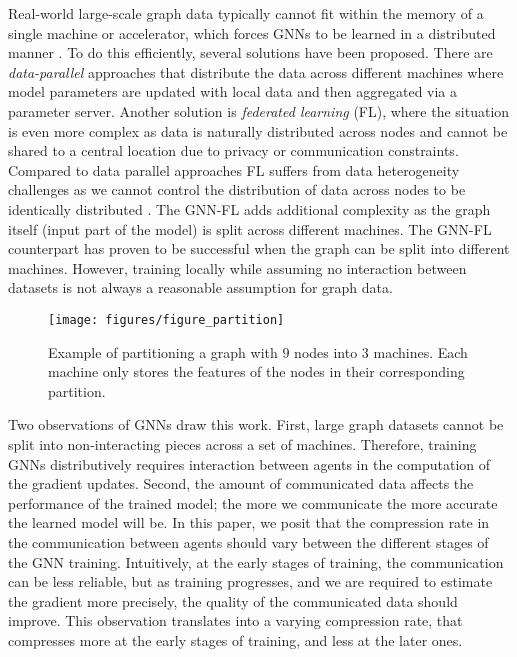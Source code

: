 \documentclass[lettersize,journal]{IEEEtran}
\begin{document}
Real-world large-scale graph data typically cannot fit within the memory of a single machine or accelerator, which forces GNNs to be learned in a distributed manner \cite{cai2021dgcl,wang2021flexgraph,zheng2020distdgl,wang2022neutronstar}. To do this efficiently, several solutions have been proposed. 
There are \textit{data-parallel} approaches that distribute the data across different machines where model parameters are updated with local data and then aggregated via a parameter server. 
Another solution is \textit{federated learning} (FL), where the situation is even more complex as data is naturally distributed across nodes and cannot be shared to a central location due to privacy or communication constraints\cite{bonawitz2019towards,li2020review,li2020federated}.  
Compared to data parallel approaches FL suffers from data heterogeneity challenges as we cannot control the distribution of data across nodes to be identically distributed \cite{shen2022an}. The GNN-FL adds additional complexity as the graph itself (input part of the model) is split across different machines.  
The GNN-FL counterpart has proven to be successful when the graph can be split into different machines\cite{he2021fedgraphnn,mei2019sgnn}. However, training locally while assuming no interaction between datasets is not always a reasonable assumption for graph data. 
 \begin{figure}
		\texttt{[image: figures/figure\_partition]} 
	\caption{Example of partitioning a graph with $9$ nodes into $3$ machines. Each machine only stores the features of the nodes in their corresponding partition. }
 \label{fig:partitions}
 \end{figure}

Two observations of GNNs draw this work. First, large graph datasets cannot be split into non-interacting pieces across a set of machines. Therefore, training GNNs distributively requires interaction between agents in the computation of the gradient updates. Second, the amount of communicated data affects the performance of the trained model; the more we communicate the more accurate the learned model will be. In this paper, we posit that the compression rate in the communication between agents should vary between the different stages of the GNN training. Intuitively, at the early stages of training, the communication can be less reliable, but as training progresses, and we are required to estimate the gradient more precisely, the quality of the communicated data should improve. This observation translates into a varying compression rate, that compresses more at the early stages of training, and less at the later ones.
\end{document}
